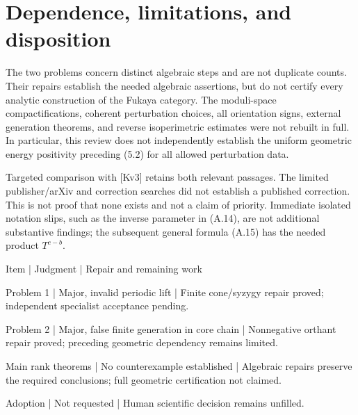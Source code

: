 \documentclass[10pt]{article}
\begin{document}
\section*{Dependence, limitations, and disposition}
The two problems concern distinct algebraic steps and are not duplicate counts. Their repairs establish the needed algebraic assertions, but do not certify every analytic construction of the Fukaya category. The moduli-space compactifications, coherent perturbation choices, all orientation signs, external generation theorems, and reverse isoperimetric estimates were not rebuilt in full. In particular, this review does not independently establish the uniform geometric energy positivity preceding (5.2) for all allowed perturbation data.\par
Targeted comparison with [Kv3] retains both relevant passages. The limited publisher/arXiv and correction searches did not establish a published correction. This is not proof that none exists and not a claim of priority. Immediate isolated notation slips, such as the inverse parameter in (A.14), are not additional substantive findings; the subsequent general formula (A.15) has the needed product \(T^{c-b}\).\par
Item | Judgment | Repair and remaining work\par
Problem 1 | Major, invalid periodic lift | Finite cone/syzygy repair proved; independent specialist acceptance pending.\par
Problem 2 | Major, false finite generation in core chain | Nonnegative orthant repair proved; preceding geometric dependency remains limited.\par
Main rank theorems | No counterexample established | Algebraic repairs preserve the required conclusions; full geometric certification not claimed.\par
Adoption | Not requested | Human scientific decision remains unfilled.\par
\end{document}
